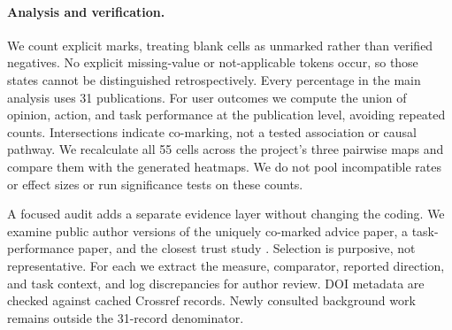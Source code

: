 \documentclass[letterpaper]{article}
\begin{document}
\paragraph{Analysis and verification.}
We count explicit marks, treating blank cells as unmarked rather than verified negatives. No explicit missing-value or not-applicable tokens occur, so those states cannot be distinguished retrospectively. Every percentage in the main analysis uses 31 publications. For user outcomes we compute the union of opinion, action, and task performance at the publication level, avoiding repeated counts. Intersections indicate co-marking, not a tested association or causal pathway. We recalculate all 55 cells across the project's three pairwise maps and compare them with the generated heatmaps. We do not pool incompatible rates or effect sizes or run significance tests on these counts.

A focused audit adds a separate evidence layer without changing the coding. We examine public author versions of the uniquely co-marked advice paper, a task-performance paper, and the closest trust study \citep{10.1145/3772318.3791233,10.1145/3772318.3791365,10.1145/3772318.3791079}. Selection is purposive, not representative. For each we extract the measure, comparator, reported direction, and task context, and log discrepancies for author review. DOI metadata are checked against cached Crossref records. Newly consulted background work remains outside the 31-record denominator.
\end{document}
